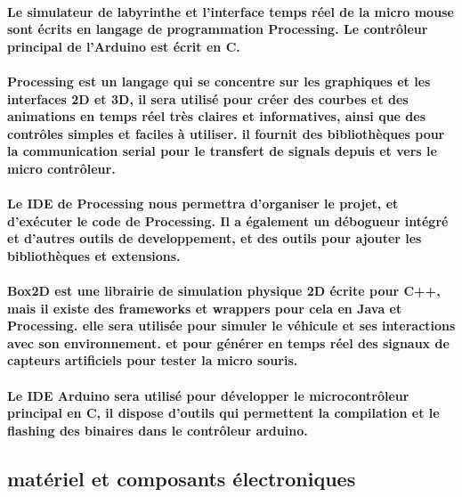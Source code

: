 \paragraph{
   Le simulateur de labyrinthe et l'interface temps réel de la micro mouse sont écrits en
langage de programmation Processing. Le contrôleur principal de l'Arduino est écrit en C.
}

\paragraph{
   Processing est un langage qui se concentre sur les graphiques et les interfaces 2D et 3D,
il sera utilisé pour créer des courbes et des animations en temps réel très claires et 
informatives, ainsi que des contrôles simples et faciles à utiliser. il fournit des 
bibliothèques pour la communication serial pour le transfert de signals depuis et vers le
micro contrôleur.
}

\paragraph{
   Le IDE de Processing nous permettra d'organiser le projet, et d'exécuter le code de Processing.
Il a également un débogueur intégré et d'autres outils de developpement, et des outils pour
ajouter les bibliothèques et extensions.
}

\paragraph{
   Box2D est une librairie de simulation physique 2D écrite pour C++, mais il existe des frameworks
et wrappers pour cela en Java et Processing. elle sera utilisée pour simuler le véhicule et ses
interactions avec son environnement. et pour générer en temps réel des signaux de capteurs
artificiels pour tester la micro souris.
}

\paragraph{
   Le IDE Arduino sera utilisé pour développer le microcontrôleur principal en C, il dispose d'outils
qui permettent la compilation et le flashing des binaires dans le contrôleur arduino.
}

\subsection{matériel et composants électroniques} \label{subsec:hardDev}
